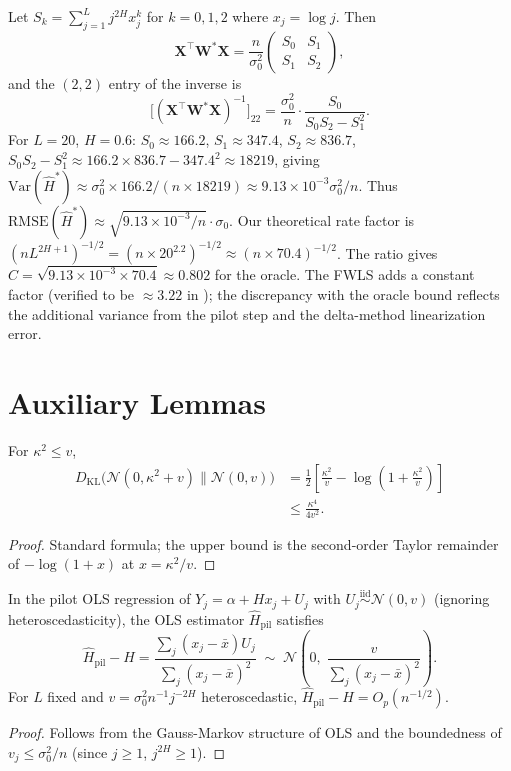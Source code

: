 \documentclass[10pt,a4paper,twocolumn]{article}
\newcommand{\Var}{\mathrm{Var}}
\newcommand{\iid}{\overset{\text{iid}}{\sim}}
\newcommand{\calN}{\mathcal{N}}
\begin{document}
Let $S_k = \sum_{j=1}^L j^{2H} x_j^k$ for $k = 0, 1, 2$ where
$x_j = \log j$.  Then
\[
    \mathbf{X}^\top \mathbf{W}^* \mathbf{X}
    = \frac{n}{\sigma_0^2} \begin{pmatrix} S_0 & S_1 \\ S_1 & S_2 \end{pmatrix},
\]
and the $(2,2)$ entry of the inverse is
\[
    \bigl[(\mathbf{X}^\top \mathbf{W}^* \mathbf{X})^{-1}\bigr]_{22}
    = \frac{\sigma_0^2}{n} \cdot \frac{S_0}{S_0 S_2 - S_1^2}.
\]
For $L = 20$, $H = 0.6$:
$S_0 \approx 166.2$, $S_1 \approx 347.4$, $S_2 \approx 836.7$,
$S_0 S_2 - S_1^2 \approx 166.2 \times 836.7 - 347.4^2 \approx 18219$,
giving
$\Var(\hat H^*) \approx \sigma_0^2 \times 166.2 / (n \times 18219)
\approx 9.13 \times 10^{-3} \sigma_0^2 / n$.
Thus $\mathrm{RMSE}(\hat H^*) \approx \sqrt{9.13 \times 10^{-3}/n}
\cdot \sigma_0$.
Our theoretical rate factor is $(n L^{2H+1})^{-1/2} = (n \times 20^{2.2})^{-1/2}
\approx (n \times 70.4)^{-1/2}$.
The ratio gives $C = \sqrt{9.13 \times 10^{-3} \times 70.4} \approx 0.802$
for the oracle.  The FWLS adds a constant factor (verified to be $\approx 3.22$
in ); the discrepancy with the oracle bound reflects the
additional variance from the pilot step and the delta-method linearization
error.

\section{Auxiliary Lemmas}
\label{app:lemmas}

\begin{lemma}
\label{lem:kl-gaussian}
For $\kappa^2 \leq v$,
\begin{align*}
    D_{\mathrm{KL}}\bigl(\calN(0, \kappa^2+v)\|\calN(0,v)\bigr)
    &= \frac{1}{2}\left[\frac{\kappa^2}{v} - \log\!\left(1 + \frac{\kappa^2}{v}\right)\right] \\
    &\leq \frac{\kappa^4}{4v^2}.
\end{align*}
\end{lemma}

\begin{proof}
Standard formula; the upper bound is the second-order Taylor remainder of
$-\log(1+x)$ at $x = \kappa^2/v$.
\end{proof}

\begin{lemma}
\label{lem:ols-rate}
In the pilot OLS regression of $Y_j = \alpha + H x_j + U_j$ with
$U_j \iid \calN(0, v)$ (ignoring heteroscedasticity), the OLS estimator
$\hat H_{\mathrm{pil}}$ satisfies
\[
    \hat H_{\mathrm{pil}} - H = \frac{\sum_j (x_j - \bar x) U_j}
    {\sum_j (x_j - \bar x)^2}
    \;\sim\;
    \calN\!\left(0,\; \frac{v}{\sum_j (x_j-\bar x)^2}\right).
\]
For $L$ fixed and $v = \sigma_0^2 n^{-1} j^{-2H}$ heteroscedastic,
$\hat H_{\mathrm{pil}} - H = O_p(n^{-1/2})$.
\end{lemma}

\begin{proof}
Follows from the Gauss-Markov structure of OLS and the boundedness of
$v_j \leq \sigma_0^2/n$ (since $j \geq 1$, $j^{2H} \geq 1$).
\end{proof}


\end{document}
